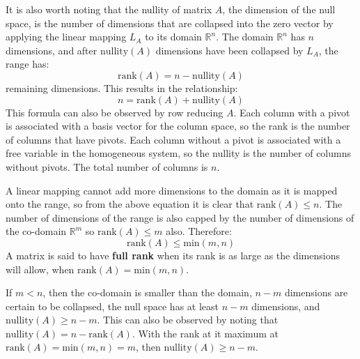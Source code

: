 \documentclass{article}
\begin{document}
\vspace{5mm}

It is also worth noting that the nullity of matrix \(A\), the dimension of the null space, is the number of dimensions that are collapsed into the zero vector by applying the linear mapping \(L_A\) to its domain \(\mathbb{R}^n\). The domain \(\mathbb{R}^n\) has \(n\) dimensions, and after \(\text{nullity}(A)\) dimensions have been collapsed by \(L_A\), the range has:
\[\text{rank}(A) = n - \text{nullity}(A)\]
remaining dimensions. This results in the relationship:
\[n = \text{rank}(A) + \text{nullity}(A)\]
This formula can also be observed by row reducing \(A\). Each column with a pivot is associated with a basis vector for the column space, so the rank is the number of columns that have pivots. Each column without a pivot is associated with a free variable in the homogeneous system, so the nullity is the number of columns without pivots. The total number of columns is \(n\).  

\vspace{5mm}

A linear mapping cannot add more dimensions to the domain as it is mapped onto the range, so from the above equation it is clear that \(\text{rank}(A) \leq n\). The number of dimensions of the range is also capped by the number of dimensions of the co-domain \(\mathbb{R}^m\) so \(\text{rank}(A) \leq m\) also. Therefore:
\[\text{rank}(A) \leq \text{min}(m,n)\]
A matrix is said to have {\bf full rank} when its rank is as large as the dimensions will allow, when \(\text{rank}(A) = \text{min}(m,n)\).

\vspace{5mm}

If \(m < n\), then the co-domain is smaller than the domain, \(n - m\) dimensions are certain to be collapsed, the null space has at least \(n - m\) dimensions, and \(\text{nullity}(A) \geq n - m\). This can also be observed by noting that \(\text{nullity}(A) = n - \text{rank}(A)\). With the rank at it maximum at \(\text{rank}(A) = \text{min}(m, n) = m\), then \(\text{nullity}(A) \geq n - m\).

\vspace{5mm}
\end{document}
